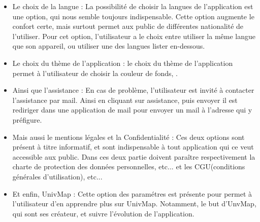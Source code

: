 \documentclass{article}
\begin{document}
\begin{itemize}
    \item Le choix de la langue : La possibilité de choisir la langues de l'application est une option, qui nous semble toujours indispensable. Cette option augmente le confort certe, mais surtout permet aux public de différentes nationalité de l'utiliser.
    Pour cet option, l'utilisateur a le choix entre utiliser la même langue que son appareil, ou utiliser une des langues lister en-dessous.   

    \item Le choix du thème de l'application : le choix du thème de l'application permet à l'utilisateur de choisir la couleur de fonds, .
    
    \item Ainsi que l'assistance : En cas de problème, l'utilisateur est invité à contacter l'assistance par mail. Ainsi en cliquant sur assistance, puis envoyer il est rediriger dans une application de mail pour envoyer un mail à l'adresse qui y préfigure. 
    
    \item Mais aussi le mentions légales et la Confidentialité : Ces deux options sont présent à titre informatif, et sont indispensable à tout application qui ce veut accessible aux public. Dans ces deux partie doivent paraître respectivement la charte de protection des données personnelles, etc... et les CGU(conditions générales d'utilisation), etc...
    
    \item Et enfin, UnivMap : Cette option des paramétres est présente pour permet à l'utilisateur d'en apprendre plus sur UnivMap. Notamment, le but d'UnvMap, qui sont ses créateur, et suivre l'évolution de l'application. 
    
\end{itemize}

\vspace{10pt}   %
\end{document}
